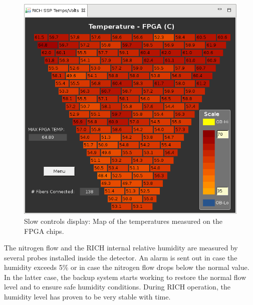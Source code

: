 \documentclass[5p,times,twocolumn]{elsarticle}
\begin{document}
\begin{figure}[t]
\begin{center}
\includegraphics[width=0.7\columnwidth]{FPGATempMap.png}
\end{center}
\caption{Slow controls display: Map of the temperatures measured on the FPGA chips.}
\label{fig:Online_FPGATempMap}
\end{figure}


The nitrogen flow and the RICH internal relative humidity are measured by several probes installed inside the
detector.
An alarm is sent out in case the humidity exceeds 5\% or in case the nitrogen flow drops below the normal value. 
In the latter case, the backup system starts working to restore the normal flow level and to ensure safe humidity
conditions. During RICH operation, the humidity level has proven to be very stable with time.

\end{document}
